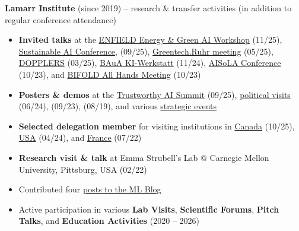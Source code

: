 \documentclass[12pt]{letter}
\begin{document}
\textbf{Lamarr Institute} (since 2019) -- research \& transfer activities (in addition to regular conference attendance)
{\footnotesize
\begin{itemize}[leftmargin=1.2em,noitemsep,topsep=0pt]
    \item \textbf{Invited talks} at the 
        \href{https://enfield-project.eu/second-energy-green-ai-workshop/}{ENFIELD Energy \& Green AI Workshop} (11/25), 
        \href{https://www.iwe.uni-bonn.de/en/events/sustainable-ai-conference-2025}{Sustainable AI Conference}, (09/25), 
        \href{https://www.business.ruhr/veranstaltungen/greentechruhr-jahrestreffen.html}{Greentech.Ruhr meeting} (05/25), 
        \href{https://www.linkedin.com/posts/lamarr-institut_dopplers2025-physics-artificialintelligence-activity-7313145002610589698-WCun}{DOPPLERS} (03/25),
        \href{https://lamarr-institute.org/events/ki-werkstatt-2024/}{BAuA KI-Werkstatt} (11/24),
        \href{https://2023-aisola.isola-conference.org/}{AISoLA Conference} (10/23),
        and \href{https://lamarr-institute.org/news/all-hands-meeting-of-the-german-ai-centers/}{BIFOLD All Hands Meeting} (10/23)    
    \item \textbf{Posters \& demos} at the \href{https://www.trustworthy-ai-summit.eu/}{Trustworthy AI Summit} (09/25), 
        \href{https://lamarr-institute.org/news/bmbf-state-secretary-mario-brandenburg-and-mkw-state-secretary-gonca-turkeli-dehnert-visit-lamarr-institute/}{political visits} (06/24), (09/23), (08/19), and various \href{https://www.linkedin.com/posts/lamarr-institut_serbia-exchange-europeanai-activity-7405182012350758913-zr-F}{strategic events} %
    \item \textbf{Selected delegation member} for visiting institutions in \href{https://lamarr-institute.org/news/canada-delegation-pressrelease/}{Canada} (10/25), \href{https://lamarr-institute.org/news/usa-delegation-trip/}{USA} (04/24), and \href{https://www.ml2r.de/en/franco-german-workshop-on-artificial-intelligence/}{France} (07/22)
    \item \textbf{Research visit \& talk} at Emma Strubell's Lab @ Carnegie Mellon University, Pittsburg, USA (02/22)
    \item Contributed four \href{https://lamarr-institute.org/de/person/fischer-raphael/}{posts to the ML Blog}~\cite{fischer_optimization_2021,fischer_preparation_2021,fischer_energy_2023b,poitz_ai_2025}
    \item Active participation in various \textbf{Lab Visits}, \textbf{Scientific Forums}, \textbf{Pitch Talks}, and \textbf{Education Activities} (2020 -- 2026)
\end{itemize}}
\end{document}
